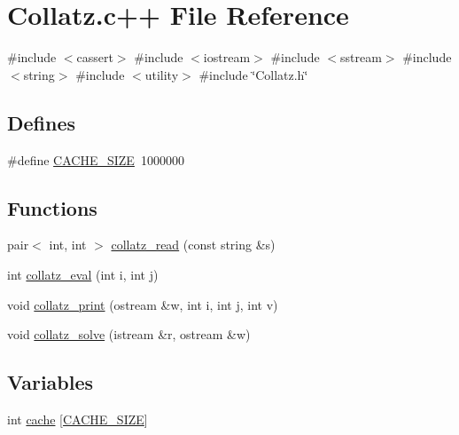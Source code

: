 \hypertarget{_collatz_8c_09_09}{\section{\-Collatz.\-c++ \-File \-Reference}
\label{_collatz_8c_09_09}
}
{\ttfamily \#include $<$cassert$>$}\*
{\ttfamily \#include $<$iostream$>$}\*
{\ttfamily \#include $<$sstream$>$}\*
{\ttfamily \#include $<$string$>$}\*
{\ttfamily \#include $<$utility$>$}\*
{\ttfamily \#include \char`\"{}\-Collatz.\-h\char`\"{}}\*
\subsection*{\-Defines}
\begin{DoxyCompactItemize}
\item 
\#define \hyperlink{_collatz_8c_09_09_a8a6befd630ea1c2ab260266f7466540c}{\-C\-A\-C\-H\-E\-\_\-\-S\-I\-Z\-E}~1000000
\end{DoxyCompactItemize}
\subsection*{\-Functions}
\begin{DoxyCompactItemize}
\item 
pair$<$ int, int $>$ \hyperlink{_collatz_8c_09_09_a2772f8a734aeab48332eb3b282f991ba}{collatz\-\_\-read} (const string \&s)
\item 
int \hyperlink{_collatz_8c_09_09_a0b0d3827a619c18aa4d96b8ee8b1c47d}{collatz\-\_\-eval} (int i, int j)
\item 
void \hyperlink{_collatz_8c_09_09_aeda0b7ea3e40e1e7487ccc436f33a559}{collatz\-\_\-print} (ostream \&w, int i, int j, int v)
\item 
void \hyperlink{_collatz_8c_09_09_a0ac646d2122741f9a9a52201bf9551cc}{collatz\-\_\-solve} (istream \&r, ostream \&w)
\end{DoxyCompactItemize}
\subsection*{\-Variables}
\begin{DoxyCompactItemize}
\item 
int \hyperlink{_collatz_8c_09_09_ae32fc8849490fce1c4d8cf9c31bb2e07}{cache} \mbox{[}\hyperlink{_sphere_collatz_8c_09_09_a8a6befd630ea1c2ab260266f7466540c}{\-C\-A\-C\-H\-E\-\_\-\-S\-I\-Z\-E}\mbox{]}
\end{DoxyCompactItemize}


